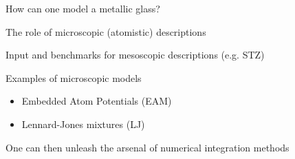 \documentclass[compress]{beamer}
\begin{document}
	\begin{frame}{How can one model a metallic glass?}
		
		
		\begin{block}{The role of microscopic (atomistic) descriptions}
			
			Input and benchmarks for mesoscopic descriptions (e.g. STZ)
		
		\end{block}
		
		
		\begin{block}{Examples of microscopic models}
			
			\begin{itemize}
				\item Embedded Atom Potentials (EAM)
				\item Lennard-Jones mixtures (LJ)
			\end{itemize}
			
		\end{block}
		
		 One can then unleash the arsenal of numerical integration methods
		
	\end{frame}
\end{document}
